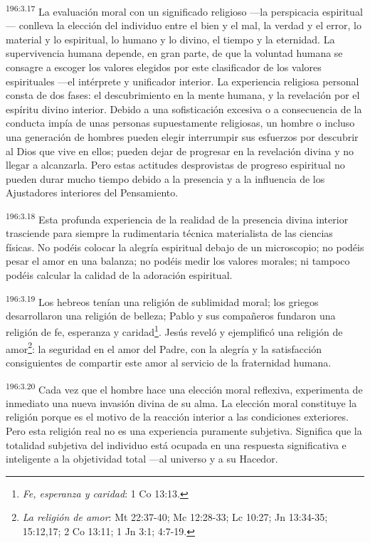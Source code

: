 \par
\textsuperscript{196:3.17} La evaluación moral con un significado religioso ---la perspicacia espiritual--- conlleva la elección del individuo entre el bien y el mal, la verdad y el error, lo material y lo espiritual, lo humano y lo divino, el tiempo y la eternidad. La supervivencia humana depende, en gran parte, de que la voluntad humana se consagre a escoger los valores elegidos por este clasificador de los valores espirituales ---el intérprete y unificador interior. La experiencia religiosa personal consta de dos fases: el descubrimiento en la mente humana, y la revelación por el espíritu divino interior. Debido a una sofisticación excesiva o a consecuencia de la conducta impía de unas personas supuestamente religiosas, un hombre o incluso una generación de hombres pueden elegir interrumpir sus esfuerzos por descubrir al Dios que vive en ellos; pueden dejar de progresar en la revelación divina y no llegar a alcanzarla. Pero estas actitudes desprovistas de progreso espiritual no pueden durar mucho tiempo debido a la presencia y a la influencia de los Ajustadores interiores del Pensamiento.

\par
\textsuperscript{196:3.18} Esta profunda experiencia de la realidad de la presencia divina interior trasciende para siempre la rudimentaria técnica materialista de las ciencias físicas. No podéis colocar la alegría espiritual debajo de un microscopio; no podéis pesar el amor en una balanza; no podéis medir los valores morales; ni tampoco podéis calcular la calidad de la adoración espiritual.

\par
\textsuperscript{196:3.19} Los hebreos tenían una religión de sublimidad moral; los griegos desarrollaron una religión de belleza; Pablo y sus compañeros fundaron una religión de fe, esperanza y caridad\footnote{\textit{Fe, esperanza y caridad}: 1 Co 13:13.}. Jesús reveló y ejemplificó una religión de amor\footnote{\textit{La religión de amor}: Mt 22:37-40; Mc 12:28-33; Lc 10:27; Jn 13:34-35; 15:12,17; 2 Co 13:11; 1 Jn 3:1; 4:7-19.}: la seguridad en el amor del Padre, con la alegría y la satisfacción consiguientes de compartir este amor al servicio de la fraternidad humana.

\par
\textsuperscript{196:3.20} Cada vez que el hombre hace una elección moral reflexiva, experimenta de inmediato una nueva invasión divina de su alma. La elección moral constituye la religión porque es el motivo de la reacción interior a las condiciones exteriores. Pero esta religión real no es una experiencia puramente subjetiva. Significa que la totalidad subjetiva del individuo está ocupada en una respuesta significativa e inteligente a la objetividad total ---al universo y a su Hacedor.


